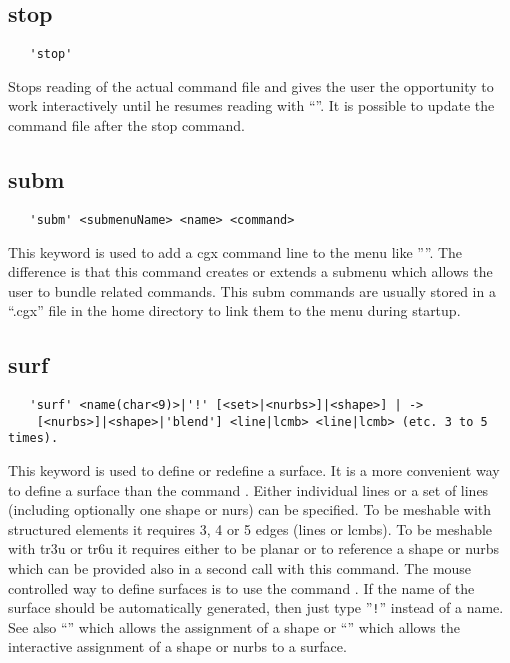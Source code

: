 \documentclass{article}
\begin{document}
\subsection{\label{stop}stop}
\begin{verbatim}
   'stop'
\end{verbatim}
Stops reading of the actual command file and gives the user the opportunity to work interactively until he resumes reading with ``''. It is possible to update the command file after the stop command.

\subsection{\label{subm}subm}
\begin{verbatim}
   'subm' <submenuName> <name> <command>
\end{verbatim}
This keyword is used to add a cgx command line to the menu like ''''. The difference is that this command creates or extends a submenu which allows the user to bundle related commands. This subm commands are usually stored in a ``.cgx'' file in the home directory to link them to the menu during startup. 

\subsection{\label{surf}surf}
\begin{verbatim}
   'surf' <name(char<9)>|'!' [<set>|<nurbs>]|<shape>] | ->
    [<nurbs>]|<shape>|'blend'] <line|lcmb> <line|lcmb> (etc. 3 to 5 times). 
\end{verbatim}
This keyword is used to define or redefine a surface. It is a more convenient way to define a surface than the command . Either individual lines or a set of lines (including optionally one shape or nurs) can be specified. To be meshable with structured elements it requires 3, 4 or 5 edges (lines or lcmbs). To be meshable with tr3u or tr6u it requires either to be planar or to reference a shape or nurbs which can be provided also in a second call with this command. The mouse controlled way to define surfaces is to use the command . 
If the name of the surface should be automatically generated, then just type ''\verb_!_'' instead of a name. See also ``'' which allows the assignment of a shape or ``'' which allows the interactive assignment of a shape or nurbs to a surface.
\end{document}
